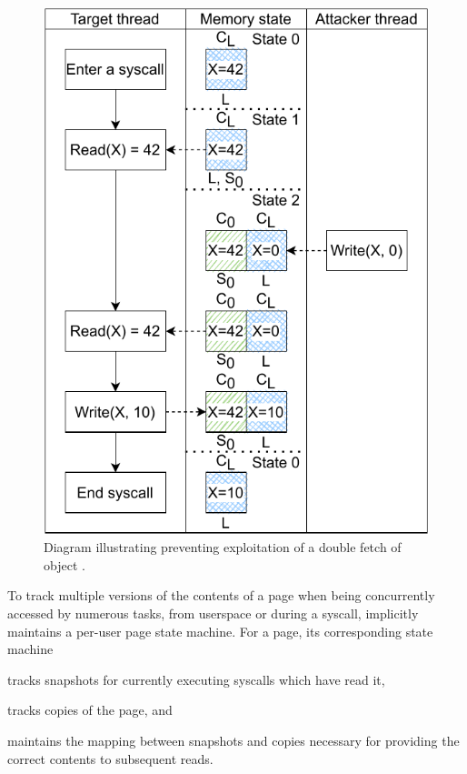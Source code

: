 \begin{figure}[h]
  \centering
  \includegraphics[width=0.95\linewidth]{media/midas/doublefetch_midas.pdf}
  \caption{Diagram illustrating \midas preventing exploitation of a
  double fetch of object .}
  \label{fig:doublefetch_midas}
\end{figure}

To track multiple versions of the contents of a page when being concurrently
accessed by numerous tasks, from userspace or during a syscall,
\midas implicitly maintains a per-user page state machine.
For a page, its corresponding state machine
\begin{inparaenum}
  \item tracks snapshots for currently executing syscalls which have read it,
  \item tracks copies of the page, and
  \item maintains the mapping between snapshots and copies necessary for providing
  the correct contents to subsequent reads. %
\end{inparaenum}

